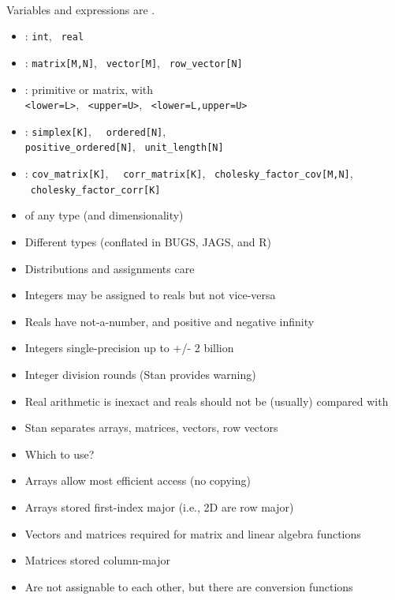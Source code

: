 \documentclass[10pt]{report}
\begin{document}
%
\\[3pt]
\hspace*{17pt}Variables and expressions are .
\begin{itemize}
\item {}: {\tt\small int}, \ {\tt\small real}
\item {}: {\tt\small matrix[M,N]}, \ {\tt\small vector[M]}, \ {\tt\small row\_vector[N]}
\item {}: primitive or matrix, with
  \\ {\tt\small <lower=L>}, \ {\tt\small <upper=U>}, \ {\tt\small <lower=L,upper=U>}
\item {}: {\tt\small simplex[K]}, \ {\tt\small
    ordered[N]},
  \\ {\tt\small positive\_ordered[N]}, \ {\tt\small unit\_length[N]}
\item {}: {\tt\small cov\_matrix[K]}, \ {\tt\small
    corr\_matrix[K]}, \ {\tt\small cholesky\_factor\_cov[M,N]}, \
  {\tt\small cholesky\_factor\_corr[K]}
\item {}  of any type (and dimensionality)
\end{itemize}


%
\begin{itemize}
\item Different types (conflated in BUGS, JAGS, and R)
\item Distributions and assignments care
\item Integers may be assigned to reals but not vice-versa
\item Reals have not-a-number, and positive and negative infinity
\item Integers single-precision up to +/- 2 billion
\item Integer division rounds (Stan provides warning)
\item Real arithmetic is inexact and reals should not be (usually) compared with \code{==}
\end{itemize}


%
\begin{itemize}
\item Stan separates arrays, matrices, vectors, row vectors
\item Which to use?
\item Arrays allow most efficient access (no copying)
\item Arrays stored first-index major (i.e., 2D are row major)
\item Vectors and matrices required for matrix and linear algebra functions
\item Matrices stored column-major
\item Are not assignable to each other, but there are conversion functions
\end{itemize}
\end{document}
